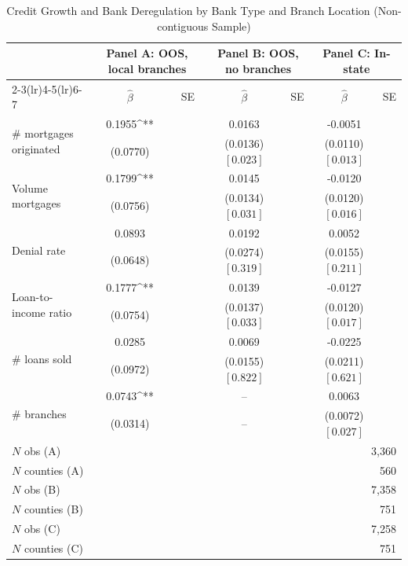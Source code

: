 \begin{table}[htbp]
\centering
\caption{Credit Growth and Bank Deregulation by Bank Type and Branch Location (Non-contiguous Sample)}
\label{tab:bank_location_branches_noncontig}
\small
\begin{tabular}{lcccccc}
\toprule
 & \multicolumn{2}{c}{Panel A: OOS, local branches} & \multicolumn{2}{c}{Panel B: OOS, no branches} & \multicolumn{2}{c}{Panel C: In-state} \\
\cmidrule(lr){2-3}\cmidrule(lr){4-5}\cmidrule(lr){6-7}
 & $\hat\beta$ & SE & $\hat\beta$ & SE & $\hat\beta$ & SE \\
\midrule
\multirow{2}{*}{\# mortgages originated} & 0.1955^{**} &  & 0.0163 &  & -0.0051 &  \\
 & (0.0770) &  & (0.0136) $[0.023]$ &  & (0.0110) $[0.013]$ &  \\[2pt]
\multirow{2}{*}{Volume mortgages} & 0.1799^{**} &  & 0.0145 &  & -0.0120 &  \\
 & (0.0756) &  & (0.0134) $[0.031]$ &  & (0.0120) $[0.016]$ &  \\[2pt]
\multirow{2}{*}{Denial rate} & 0.0893 &  & 0.0192 &  & 0.0052 &  \\
 & (0.0648) &  & (0.0274) $[0.319]$ &  & (0.0155) $[0.211]$ &  \\[2pt]
\multirow{2}{*}{Loan-to-income ratio} & 0.1777^{**} &  & 0.0139 &  & -0.0127 &  \\
 & (0.0754) &  & (0.0137) $[0.033]$ &  & (0.0120) $[0.017]$ &  \\[2pt]
\multirow{2}{*}{\# loans sold} & 0.0285 &  & 0.0069 &  & -0.0225 &  \\
 & (0.0972) &  & (0.0155) $[0.822]$ &  & (0.0211) $[0.621]$ &  \\[2pt]
\multirow{2}{*}{\# branches} & 0.0743^{**} &  & -- &  & 0.0063 &  \\
 & (0.0314) &  & -- &  & (0.0072) $[0.027]$ &  \\[2pt]
\midrule
$N$ obs (A) & \multicolumn{6}{r}{3,360} \\
$N$ counties (A) & \multicolumn{6}{r}{560} \\
$N$ obs (B) & \multicolumn{6}{r}{7,358} \\
$N$ counties (B) & \multicolumn{6}{r}{751} \\
$N$ obs (C) & \multicolumn{6}{r}{7,258} \\
$N$ counties (C) & \multicolumn{6}{r}{751} \\
\bottomrule
\end{tabular}
\begin{tablenotes}

\end{tablenotes}
\end{table}
